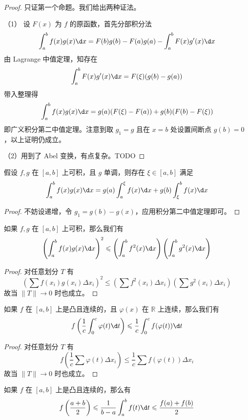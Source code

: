 \begin{proof}
	只证第一个命题。我们给出两种证法。

	（1） 设 $F(x)$ 为 $f$ 的原函数，首先分部积分法
	\[ \int_{a}^{b} f(x) g(x) \d x = F(b)g(b) - F(a)g(a) - \int_{a}^{b} F(x)g'(x) \d x \]
	由 Lagrange 中值定理，知存在
	\[ \int_{a}^{b} F(x)g'(x) \d x = F(\xi) (g(b) - g(a)) \]
	带入整理得
	\[ \int_{a}^{b} f(x) g(x) \d x = g(a) (F(\xi) - F(a)) + g(b) (F(b) - F(\xi)) \]
	即广义积分第二中值定理。注意到取 $g_1 = g$ 且在 $x=b$ 处设置间断点 $g(b) = 0$，以上证明仍成立。

	（2）用到了 Abel 变换，有点复杂。TODO
\end{proof}

\begin{theorem}[广义积分第二中值定理]
	假设 $f, g$ 在 $[a,b]$ 上可积，且 $g$ 单调，则存在 $\xi \in [a, b]$ 满足
	\[ \int_{a}^{b} f(x) g(x) \d x = g(a) \int_{a}^{\xi} f(x) \d x + g(b) \int_{\xi}^{b} f(x) \d x \]
\end{theorem}

\begin{proof}
	不妨设递增，令 $g_1 = g(b) - g(x)$，应用积分第二中值定理即可。
\end{proof}

\begin{theorem}
	如果 $f, g$ 在 $[a, b]$ 上可积，那么我们有
	\[ \left(\int_{a}^{b} f(x) g(x) \d x \right)^2 \leqslant \left(\int_{a}^{b} f^2(x)\d x \right)\left(\int_{a}^{b} g^2(x) \d x\right) \]
\end{theorem}
\begin{proof}
	对任意划分 $T$ 有
	\[ \left(\sum f(x_i) g(x_i) \Delta x_i\right)^2 \leqslant \left(\sum f^2(x_i) \Delta x_i\right)\left(\sum g^2(x_i) \Delta x_i\right) \]
	故当 $\|T\| \to 0$ 时也成立。
\end{proof}

\begin{theorem}
	如果 $f$ 在 $[a, b]$ 上是凸且连续的，且 $\varphi(x)$ 在 $\mathbb{R}$ 上连续，那么我们有
	\[ f\left(\frac{1}{c} \int_{0}^{c} \varphi(t) \d t \right) \leqslant \frac{1}{c} \int_{0}^{c} f(\varphi(t))\d t \]
\end{theorem}
\begin{proof}
	对任意划分 $T$ 有
	\[ f\left(\frac{1}{c} \sum \varphi(t) \Delta x_i \right) \leqslant \frac{1}{c} \sum f(\varphi(t))\Delta x_i \]
	故当 $\|T\| \to 0$ 时也成立。
\end{proof}

\begin{theorem}
	如果 $f$ 在 $[a, b]$ 上是凸且连续的，那么有
	\[ f\left(\frac{a+b}{2}\right) \leqslant \frac{1}{b - a} \int_{a}^{b} f(t) \d t \leqslant \frac{f(a) + f(b)}{2} \]
\end{theorem}

